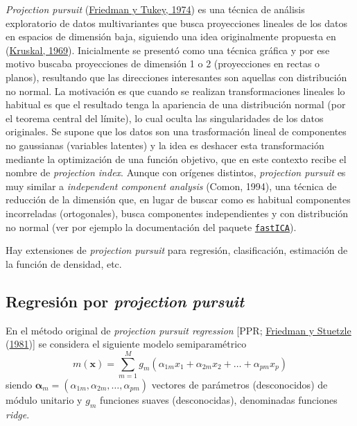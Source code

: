 \documentclass[
  spanish,
]{book}
\theoremstyle{break}
\theoremstyle{definition}
\theoremstyle{definition}
\theoremstyle{definition}
\theoremstyle{definition}
\theoremstyle{remark}
\begin{document}
\emph{Projection pursuit} (\protect\hyperlink{ref-friedman1974projection}{Friedman y Tukey, 1974}) es una técnica de análisis exploratorio de datos multivariantes que busca proyecciones lineales de los datos en espacios de dimensión baja, siguiendo una idea originalmente propuesta en (\protect\hyperlink{ref-kruskal1969toward}{Kruskal, 1969}).
Inicialmente se presentó como una técnica gráfica y por ese motivo buscaba proyecciones de dimensión 1 o 2 (proyecciones en rectas o planos), resultando que las direcciones interesantes son aquellas con distribución no normal.
La motivación es que cuando se realizan transformaciones lineales lo habitual es que el resultado tenga la apariencia de una distribución normal (por el teorema central del límite), lo cual oculta las singularidades de los datos originales.
Se supone que los datos son una trasformación lineal de componentes no gaussianas (variables latentes) y la idea es deshacer esta transformación mediante la optimización de una función objetivo, que en este contexto recibe el nombre de \emph{projection index}.
Aunque con orígenes distintos, \emph{projection pursuit} es muy similar a \emph{independent component analysis} (Comon, 1994), una técnica de reducción de la dimensión que, en lugar de buscar como es habitual componentes incorreladas (ortogonales), busca componentes independientes y con distribución no normal (ver por ejemplo la documentación del paquete \href{https://CRAN.R-project.org/package=fastICA}{\texttt{fastICA}}).

Hay extensiones de \emph{projection pursuit} para regresión, clasificación, estimación de la función de densidad, etc.

\hypertarget{ppr}{%
\subsection{\texorpdfstring{Regresión por \emph{projection pursuit}}{Regresión por projection pursuit}}\label{ppr}}

En el método original de \emph{projection pursuit regression} {[}PPR; \protect\hyperlink{ref-friedman1981projection}{Friedman y Stuetzle} (\protect\hyperlink{ref-friedman1981projection}{1981}){]} se considera el siguiente modelo semiparamétrico
\[m(\mathbf{x}) = \sum_{m=1}^M g_m (\alpha_{1m}x_1 + \alpha_{2m}x_2 + \ldots + \alpha_{pm}x_p)\]
siendo \(\boldsymbol{\alpha}_m = (\alpha_{1m}, \alpha_{2m}, \ldots, \alpha_{pm})\) vectores de parámetros (desconocidos) de módulo unitario y \(g_m\) funciones suaves (desconocidas), denominadas funciones \emph{ridge}.
\end{document}
